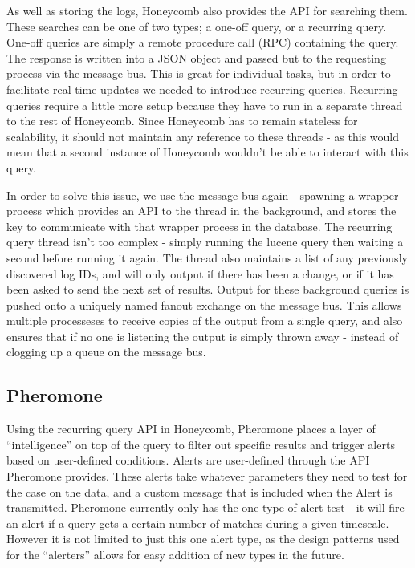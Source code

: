 As well as storing the logs, Honeycomb also provides the API for searching them.
These searches can be one of two types; a one-off query, or a recurring query.
One-off queries are simply a remote procedure call (RPC) containing the query.
The response is written into a JSON object and passed but to the requesting
process via the message bus. This is great for individual tasks, but in order to
facilitate real time updates we needed to introduce recurring queries. Recurring
queries require a little more setup because they have to run in a separate
thread to the rest of Honeycomb. Since Honeycomb has to remain stateless for
scalability, it should not maintain any reference to these threads - as this
would mean that a second instance of Honeycomb wouldn’t be able to interact with
this query.

In order to solve this issue, we use the message bus again - spawning a wrapper
process which provides an API to the thread in the background, and stores the
key to communicate with that wrapper process in the database. The recurring
query thread isn’t too complex - simply running the lucene query then waiting a
second before running it again. The thread also maintains a list of any
previously discovered log IDs, and will only output if there has been a change,
or if it has been asked to send the next set of results. Output for these
background queries is pushed onto a uniquely named fanout exchange on the
message bus. This allows multiple processeses to receive copies of the output
from a single query, and also ensures that if no one is listening the output is
simply thrown away - instead of clogging up a queue on the message bus.

\subsection{Pheromone}

Using the recurring query API in Honeycomb, Pheromone places a layer of
“intelligence” on top of the query to filter out specific results and trigger
alerts based on user-defined conditions. Alerts are user-defined through the API
Pheromone provides. These alerts take whatever parameters they need to test for
the case on the data, and a custom message that is included when the Alert is
transmitted. Pheromone currently only has the one type of alert test - it will
fire an alert if a query gets a certain number of matches during a given
timescale. However it is not limited to just this one alert type, as the design
patterns used for the “alerters” allows for easy addition of new types in the
future.

